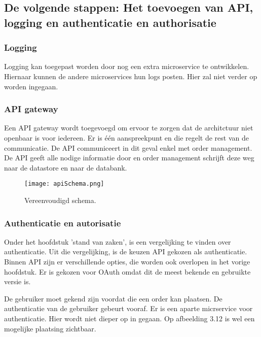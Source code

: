 \subsection{De volgende stappen: Het toevoegen van API, logging en authenticatie en authorisatie}
\subsubsection{Logging}
Logging kan toegepast worden door nog een extra microservice te ontwikkelen. Hiernaar kunnen de andere microservices hun logs posten. Hier zal niet verder op worden ingegaan. 

\subsubsection{API gateway}
Een API gateway wordt toegevoegd om ervoor te zorgen dat de architctuur niet openbaar is voor iedereen. Er is één aanspreekpunt en die regelt de rest van de communicatie.
De API communiceert in dit geval enkel met order management. De API geeft alle nodige informatie door en order management schrijft deze weg naar de datastore en naar de databank.
\begin{figure}[h]
	\texttt{[image: apiSchema.png]}
	\caption{Vereenvoudigd schema.}
	\centering
\end{figure}

\subsubsection{Authenticatie en autorisatie}
Onder het hoofdstuk 'stand van zaken', is een vergelijking te vinden over authenticatie. Uit die vergelijking, is de keuzen API gekozen als authenticatie. Binnen API zijn er verschillende opties, die worden ook overlopen in het vorige hoofdstuk. Er is gekozen voor OAuth omdat dit de meest bekende en gebruikte versie is.

De gebruiker moet gekend zijn voordat die een order kan plaatsen. De authenticatie van de gebruiker gebeurt vooraf. Er is een aparte micrservice voor authenticatie. Hier wordt niet dieper op in gegaan.
Op afbeelding 3.12 is wel een mogelijke plaatsing zichtbaar.


